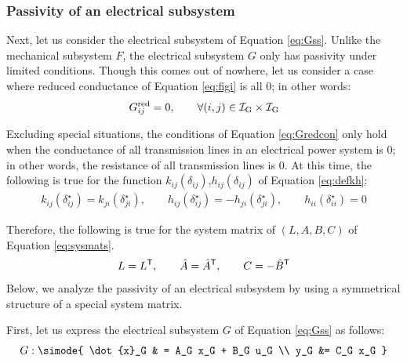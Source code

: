 \documentclass[graybox, envcountchap]{svmult}
\begin{document}
\smallskip
\subsubsection{Passivity of an electrical subsystem}
Next, let us consider the electrical subsystem of Equation \ref{eq:Gss}.
Unlike the mechanical subsystem $F$, the electrical subsystem $G$ only has passivity under limited conditions.
Though this comes out of nowhere, let us consider a case where reduced conductance of Equation \ref{eq:figi} is all 0; in other words:
\begin{align}\label{eq:Gredcon}
G^{\rm red}_{ij}=0,\qquad 
\forall (i, j) \in \mathcal{I}_{\rm G} \times \mathcal{I}_{\rm G}
\end{align}

Excluding special situations, the conditions of Equation \ref{eq:Gredcon} only hold when the conductance of all transmission lines in an electrical power system is 0; in other words, the resistance of all transmission lines is 0.
At this time, the following is true for the function $k_{ij}(\delta_{ij})$,$h_{ij}(\delta_{ij})$ of Equation \ref{eq:defkh}:
\begin{align*}
k_{ij}(\delta_{ij}^{\star}) =
k_{ji}(\delta_{ji}^{\star})
,\qquad
h_{ij}(\delta_{ij}^{\star}) = 
- h_{ji}(\delta_{ji}^{\star}),\qquad
h_{ii}(\delta_{ii}^{\star}) = 0
\end{align*}

Therefore, the following is true for the system matrix of $(L,A,B,C)$ of Equation \ref{eq:sysmats}.
\begin{align}\label{eq:sysmatst}
L=L^{\sf T} ,\qquad
\hat{A} = \hat{A}^{\sf T},\qquad
C= -\hat{B}^{\sf T}
\end{align}
Below, we analyze the passivity of an electrical subsystem by using a symmetrical structure of a special system matrix. 

First, let us express the electrical subsystem $G$ of Equation \ref{eq:Gss} as follows:
\begin{align}
G: \simode{
\dot{x}_G & = A_G x_G + B_G u_G \\
y_G &= C_G x_G
}
\end{align}
\end{document}

